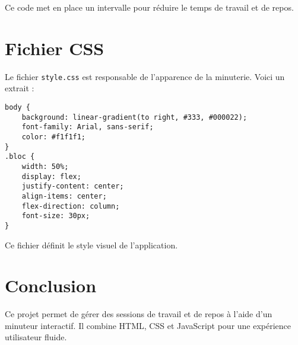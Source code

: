 \documentclass{article}
\begin{document}
Ce code met en place un intervalle pour réduire le temps de travail et de repos.

\section{Fichier CSS}
Le fichier \texttt{style.css} est responsable de l'apparence de la minuterie. Voici un extrait :

\begin{lstlisting}[style=customcss]
body {
    background: linear-gradient(to right, #333, #000022);
    font-family: Arial, sans-serif;
    color: #f1f1f1;
}
.bloc {
    width: 50%;
    display: flex;
    justify-content: center;
    align-items: center;
    flex-direction: column;
    font-size: 30px;
}
\end{lstlisting}

Ce fichier définit le style visuel de l'application.

\section{Conclusion}
Ce projet permet de gérer des sessions de travail et de repos à l'aide d'un minuteur interactif. Il combine HTML, CSS et JavaScript pour une expérience utilisateur fluide.
\end{document}

